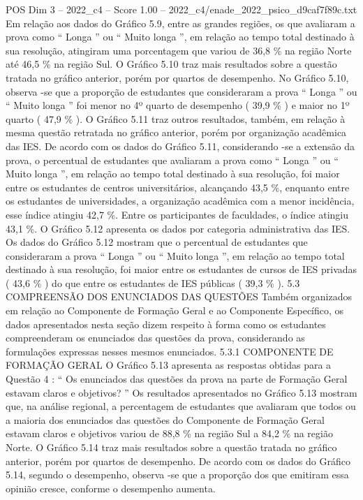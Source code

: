 \begin{textsample}{POS Dim 3 – 2022\_c4 – Score 1.00 – 2022\_c4/enade\_2022\_psico\_d9caf7f89c.txt}
Em relação aos dados do Gráfico 5.9, entre as grandes regiões, os que avaliaram a prova como “ Longa ” ou “ Muito longa ”, em relação ao tempo total destinado à sua resolução, atingiram uma porcentagem que variou de 36,8 \% na região Norte até 46,5 \% na região Sul.
O Gráfico 5.10 traz mais resultados sobre a questão tratada no gráfico anterior, porém por quartos de desempenho.
No Gráfico 5.10, observa -se que a proporção de estudantes que consideraram a prova “ Longa ” ou “ Muito longa ” foi menor no 4º quarto de desempenho ( 39,9 \% ) e maior no 1º quarto ( 47,9 \% ).
O Gráfico 5.11 traz outros resultados, também, em relação à mesma questão retratada no gráfico anterior, porém por organização acadêmica das IES.
De acordo com os dados do Gráfico 5.11, considerando -se a extensão da prova, o percentual de estudantes que avaliaram a prova como “ Longa ” ou “ Muito longa ”, em relação ao tempo total destinado à sua resolução, foi maior entre os estudantes de centros universitários, alcançando 43,5 \%, enquanto entre os estudantes de universidades, a organização acadêmica com a menor incidência, esse índice atingiu 42,7 \%.
Entre os participantes de faculdades, o índice atingiu 43,1 \%.
O Gráfico 5.12 apresenta os dados por categoria administrativa das IES.
Os dados do Gráfico 5.12 mostram que o percentual de estudantes que consideraram a prova “ Longa ” ou “ Muito longa ”, em relação ao tempo total destinado à sua resolução, foi maior entre os estudantes de cursos de IES privadas ( 43,6 \% ) do que entre os estudantes de IES públicas ( 39,3 \% ). 5.3 COMPREENSÃO DOS ENUNCIADOS DAS QUESTÕES Também organizados em relação ao Componente de Formação Geral e ao Componente Específico, os dados apresentados nesta seção dizem respeito à forma como os estudantes compreenderam os enunciados das questões da prova, considerando as formulações expressas nesses mesmos enunciados. 5.3.1 COMPONENTE DE FORMAÇÃO GERAL O Gráfico 5.13 apresenta as respostas obtidas para a Questão 4 : “ Os enunciados das questões da prova na parte de Formação Geral estavam claros e objetivos? ” Os resultados apresentados no Gráfico 5.13 mostram que, na análise regional, a percentagem de estudantes que avaliaram que todos ou a maioria dos enunciados das questões do Componente de Formação Geral estavam claros e objetivos variou de 88,8 \% na região Sul a 84,2 \% na região Norte.
O Gráfico 5.14 traz mais resultados sobre a questão tratada no gráfico anterior, porém por quartos de desempenho.
De acordo com os dados do Gráfico 5.14, segundo o desempenho, observa -se que a proporção dos que emitiram essa opinião cresce, conforme o desempenho aumenta.

\end{textsample}
